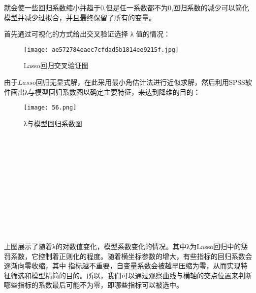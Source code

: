 \documentclass[12pt,a4paper]{nmmcm}
\begin{document}
就会使一些回归系数缩小并趋于0,但是任一系数都不为0,回归系数的减少可以简化模型并减少过拟合，并且最终保留了所有的变量。

首先通过可视化的方式给出交叉验证选择 λ 值的情况：
\\
\begin{figure}[H]
    \centering
    \texttt{[image: ae572784eaec7cfdad5b1814ee9215f.jpg]}
    \caption{Lasso回归交叉验证图}
    \label{fig:enter-label}
\end{figure}
由于$Lasso$回归无显式解，在此采用最小角估计法进行近似求解，然后利用SPSS软件画出λ与模型回归系数图以确定主要特征，来达到降维的目的：
\begin{figure}[h]
    \centering
    \texttt{[image: 56.png]}
    \caption{λ与模型回归系数图}
    \label{fig:enter-label}
\end{figure}

\\
\\
\\
\\
\\
\\
\\
\\
\\
\\
\\
上图展示了随着λ的对数值变化，模型系数变化的情况。其中λ为Lasso回归中的惩罚系数，它控制着正则化的程度。随着横坐标参数的增大，有些指标的回归系数会逐渐向零收缩，其中 指标越不重要，自变量系数会被越早压缩为零，从而实现特征筛选和模型精简的目的。所以，我们可以通过观察曲线与横轴的交点位置来判断哪些指标的系数最后可能不为零，即哪些指标可以被选中。
\end{document}
